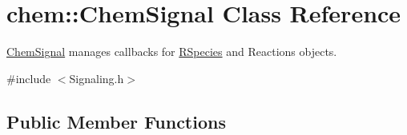 \hypertarget{classchem_1_1ChemSignal}{\section{chem\-:\-:Chem\-Signal Class Reference}
\label{classchem_1_1ChemSignal}
}


\hyperlink{classchem_1_1ChemSignal}{Chem\-Signal} manages callbacks for \hyperlink{classchem_1_1RSpecies}{R\-Species} and Reactions objects.  




{\ttfamily \#include $<$Signaling.\-h$>$}

\subsection*{Public Member Functions}
